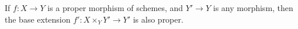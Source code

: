 If $f: X \to Y$ is a proper morphism of schemes, and $Y' \to Y$ is any morphism, then the base extension $f': X \times_Y Y' \to Y'$ is also proper.
